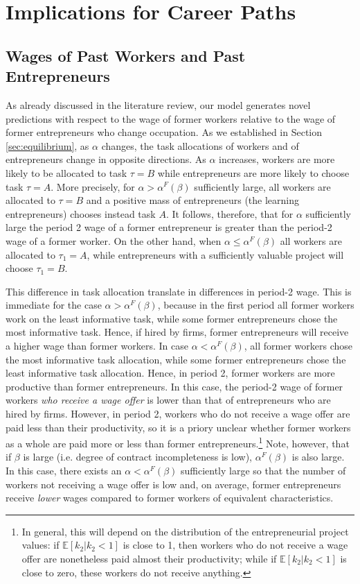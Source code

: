 \documentclass[12pt,american]{paper}
\theoremstyle{remark}
\newcommand{\E}[1]{\mathbb E[#1]}
\begin{document}
\section{Implications for Career Paths}\label{sec:implications}

\subsection{Wages of Past Workers and Past Entrepreneurs}\label{sec:wages of past workers vs entrepreneurs}

As already discussed in the literature review, our model generates novel predictions with respect to the wage of former workers relative to the wage of former entrepreneurs who change occupation.  As we established in Section \ref{sec:equilibrium}, as $\alpha$ changes, the task allocations of workers and of entrepreneurs change in opposite directions. As $\alpha$ increases, workers are more likely to be allocated to task $\tau=B$ while entrepreneurs are more likely to choose task $\tau=A$.  More precisely, for $\alpha>\alpha^F(\beta)$ sufficiently large,  all workers are allocated to $\tau=B$ and a positive mass of entrepreneurs (the learning entrepreneurs) chooses instead task $A$. It follows, therefore, that for $\alpha$ sufficiently large the period 2 wage of a former entrepreneur is greater than the period-2 wage of a former worker. On the other hand, when $\alpha\leq \alpha^F(\beta)$ all workers are allocated to $\tau_1=A$, while entrepreneurs with a sufficiently valuable project will choose $\tau_1=B$. 

This difference in task allocation translate in differences in period-2 wage. This is immediate for the case $\alpha>\alpha^F(\beta)$, because in the first period all former workers work on the least informative task, while some former entrepreneurs chose the most informative task. Hence, if hired by firms, former entrepreneurs will receive a higher wage than former workers. In case $\alpha<\alpha^F(\beta)$, all former workers chose the most informative task allocation, while some former entrepreneurs chose the least informative task allocation. Hence, in period 2, former workers are more productive than former entrepreneurs. In this case, the period-2 wage of former workers\textit{ who receive a wage offer }is lower than that of entrepreneurs who are hired by firms. However, in period 2, workers who do not receive a wage offer are paid less than their productivity, so it is a priory unclear   whether former workers as a whole are paid more or less than former entrepreneurs.\footnote{In general, this will depend on the distribution of the entrepreneurial project values: if $\E{k_2|k_2<1}$ is close to 1, then workers who do not receive a wage offer are nonetheless paid almost their productivity; while if $\E{k_2|k_2<1}$ is close to zero, these workers do not receive anything.  }
Note, however, that  if $\beta$ is large (i.e. degree of contract incompleteness is low), $\alpha^F(\beta)$ is also large. In this case, there exists  an $\alpha<\alpha^F(\beta)$ sufficiently large so that the number of workers not receiving a wage offer is low and, on average, former entrepreneurs  receive \textit{lower} wages compared to former workers of equivalent characteristics. 
\end{document}
